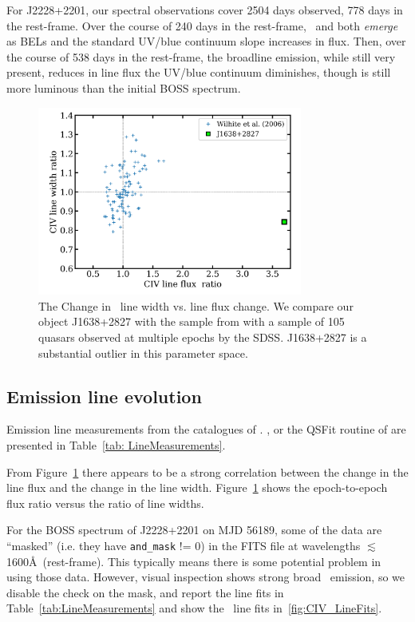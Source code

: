 \documentclass[a4paper,fleqn,usenatbib]{mnras}
\begin{document}
For J2228+2201, our spectral observations cover 2504 days observed,
778 days in the rest-frame. Over the course of 240 days in the rest-frame, \civ\ and \ciii both {\it emerge} as BELs and
the standard UV/blue continuum slope increases in flux.
Then, over the course of 538 days in the rest-frame, the broadline emission, while still
very present, reduces in line flux the UV/blue continuum diminishes,
though is still more luminous than the initial BOSS spectrum. 




\begin{figure}
  \centering
  \includegraphics[width=8.7cm, trim=0.2cm 0.2cm 0.2cm 0.2cm, clip]
  {figures/Wilhite_2006_Fig2_redux_20190926.png}
   \vspace{-12pt}
  \caption[]{The Change in \civ\ line width vs. line flux change. 
We compare our object J1638+2827 with the sample 
from \citet{Wilhite2006} with a sample of 105 quasars observed at
multiple epochs by the SDSS. J1638+2827 is a substantial outlier 
in this parameter space.}
  \label{fig:Wilhite2006_comparison}
\end{figure}
\subsection{Emission line evolution}
Emission line measurements from the catalogues of \citet{Shen2011}.
\citet{Hamann2017}, \citet{Kozlowski2017} or the QSFit routine of
\citet{Calderone2017} are presented in Table~\ref{tab:
LineMeasurements}.

From Figure~\ref{fig:Wilhite2006_comparison} there appears to be a
strong correlation between the change in the line flux and the change
in the line width.  Figure~\ref{fig:Wilhite2006_comparison} shows the
epoch-to-epoch flux ratio versus the ratio of line widths.

For the BOSS spectrum of J2228+2201 on MJD 56189, some of the data are
``masked'' (i.e. they have {\tt and\_mask} != 0) in the FITS file at
wavelengths $\lesssim$1600\AA\ (rest-frame).  This typically means
there is some potential problem in using those data. However, visual
inspection shows strong broad \civ\ emission, so we disable the check on the mask,
and report the line fits in Table~\ref{tab:LineMeasurements} and show the \civ\ line 
fits in~\ref{fig:CIV_LineFits}.
\end{document}
